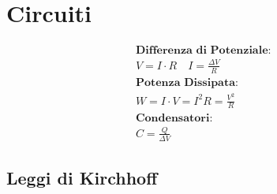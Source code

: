 \section{Circuiti}
\begin{gather*}
    \textbf{Differenza di Potenziale: } \\ V = I \cdot R \quad I = \frac{\Delta V}{R} \\
    \textbf{Potenza Dissipata: } \\
    W = I \cdot V = I^2 R = \frac{V^2}{R} \\
    \textbf{Condensatori: } \\ C = \frac{Q}{\Delta V}
\end{gather*}
\subsection{Leggi di Kirchhoff}
